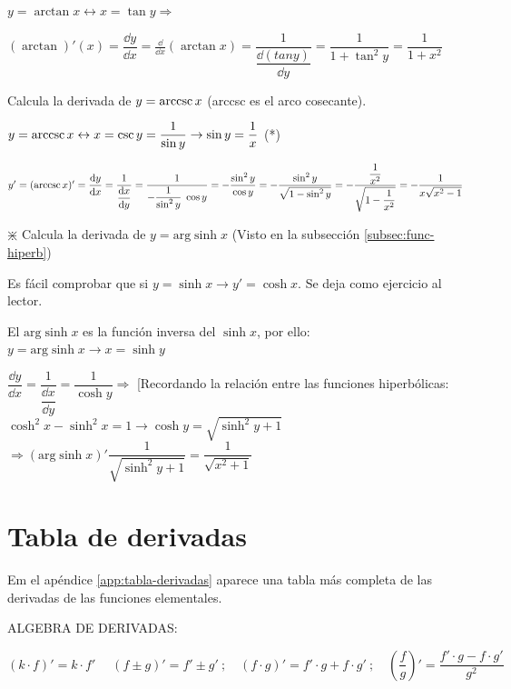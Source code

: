 	$y=\arctan x \leftrightarrow x=\tan y \Rightarrow$
	
	$(\arctan)'(x)=\dfrac {\dd y}{\dd x}= \frac {\dd }{\dd x} (\arctan x) = \dfrac {1}{\dfrac {\dd (tan y)}{\dd y}}= \dfrac {1}{1+\tan^2 y}=\dfrac {1}{1+x^2}$
	
	
	\begin{ejem} Calcula la derivada de $y=\arccsc x$ (arccsc es el arco cosecante).
	
	$y=\arccsc x \leftrightarrow x=\csc y = \dfrac 1 {\sin y} \to \sin y= \dfrac 1 x$ (*)
	
	$y'=(\arccsc x)'=\dfrac {\dd y}{\dd x}= \dfrac {1}{\dfrac {\dd x}{\dd y}}= \dfrac {1}{-\dfrac {1}{\sin^2 y}\; \cos y}=-\dfrac {\sin^2 y}{\cos y}= -\dfrac {\sin^2 y}{\sqrt{1-\sin^2 y}}= -\dfrac {\dfrac {1}{x^2}}{\sqrt{1-\dfrac {1}{x^2}}}=-\dfrac {1}{x\sqrt{x^2-1}} $
		
	\end{ejem}
	
	\begin{ejem} $\divideontimes$ Calcula la derivada de $y=\mathrm{arg\;sinh}\; x$ (Visto en la subsección \ref{subsec:func-hiperb})
	
	Es fácil comprobar que si $y=\sinh x \to y'=\cosh x$. Se deja como ejercicio al lector.
	
	El $\mathrm{arg\;sinh}\; x$ es la función inversa del $\sinh x$, por ello: $y=\mathrm{arg\;sinh}\; x \to x=\sinh y$
	
	$\dfrac {\dd y}{\dd x}= \dfrac {1}{\dfrac {\dd x}{\dd y} }= \dfrac 1 {\cosh y} \Rightarrow$ [Recordando la relación entre las funciones hiperbólicas: $\cosh^2 x - \sinh^2 x=1 \to \cosh y=\sqrt{\sinh^2 y + 1}$  $\Rightarrow (\mathrm{arg\;sinh}\; x)'\dfrac {1}{\sqrt{\sinh^2 y + 1}}=\dfrac {1}{\sqrt{x^2+1}}$
	\end{ejem}
	
	\section{Tabla de derivadas}
	
	Em el apéndice \ref{app:tabla-derivadas} aparece una tabla más completa de las derivadas de las funciones elementales.
	
	ALGEBRA DE DERIVADAS:
		
		$(k\cdot f)'=k\cdot f' \; \quad (f\pm g)'=f' \pm g'\ ;  \quad (f\cdot g)'=f'\cdot g + f\cdot g' \ ; \quad \left({\dfrac f g}\right) '=\dfrac {f'\cdot g - f\cdot g'}{g^2}$
		
		\vspace{5mm}
		
